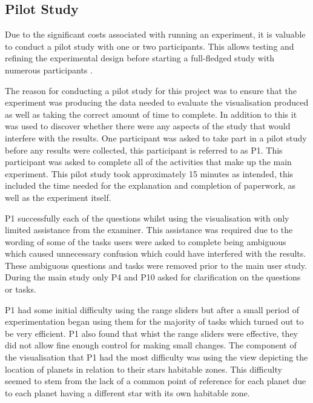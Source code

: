 \subsection{Pilot Study}
Due to the significant costs associated with running an experiment, it 
is valuable to conduct a pilot study with one or two 
participants. This allows testing and refining the experimental
design before starting a full-fledged study with numerous 
participants \cite{kosara2003thoughts}. 

The reason for conducting a pilot study for this project was to ensure that
the experiment was
producing the data needed to evaluate the visualisation produced as well
as taking the correct amount of time to complete. In addition to this it was
used to discover whether there were any aspects of the study that would
interfere with the results. One participant was asked to take part in a pilot study before any results were
collected, this participant is referred to as P1. This participant was asked to
complete all of the activities that
make up the main experiment. This pilot study took approximately 15 minutes as
intended, this included the time needed for the explanation and completion of
paperwork, as well as the experiment itself.

P1 successfully each of the questions whilst using the visualisation with only
limited assistance from the examiner. This assistance was required due to the
wording of
some of the tasks users were asked to complete being ambiguous which caused
unnecessary confusion which could have interfered with the results. These
ambiguous questions and
tasks were removed prior to the main user study. During the main study only P4
and P10 asked for clarification on the questions or tasks.

P1 had some initial difficulty using the range sliders but after a small period
of experimentation began using them for the majority of tasks which turned out
to be very efficient. P1 also found that whist the range sliders were effective,
they did not allow fine enough control for making small changes. The component of the visualisation that P1 had the most difficulty was using the
view depicting the location of planets in relation to their stars habitable
zones. This difficulty seemed to stem from the lack of a common point of
reference for each planet due to each planet having a different star with its
own habitable zone.

